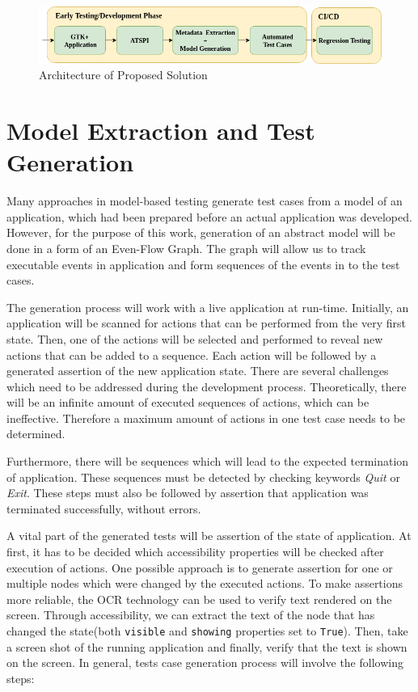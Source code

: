 \begin{figure}[hbt]
	\centering
	\includegraphics[width=1\textwidth]{obrazky-figures/diagram.png}
	\caption{Architecture of Proposed Solution}
	\label{Diagram}
\end{figure}


\section{Model Extraction and Test Generation}
Many approaches in model-based testing generate test cases from a model of an application, which had been prepared before an actual application was developed. However, for the purpose of this work, generation of an abstract model will be done in a form of an Even-Flow Graph. The graph will allow us to track executable events in application and form sequences of the events in to the test cases. 

The generation process will work with a live application at run-time. Initially, an application will be scanned for actions that can be performed from the very first state. Then, one of the actions will be selected and performed to reveal new actions that can be added to a sequence. Each action will be followed by a generated assertion of the new application state. There are several challenges which need to be addressed during the development process. Theoretically, there will be an infinite amount of executed sequences of actions, which can be ineffective. Therefore a maximum amount of actions in one test case needs to be determined. 

Furthermore, there will be sequences which will lead to the expected termination of application. These sequences must be detected by checking keywords \textit{Quit} or \textit{Exit}. These steps must also be followed by assertion that application was terminated successfully, without errors. 

A vital part of the generated tests will be assertion of the state of application. At first, it has to be decided which accessibility properties will be checked after execution of actions. One possible approach is to generate assertion for one or multiple nodes which were changed by the executed actions. To make assertions more reliable, the OCR technology can be used to verify text rendered on the screen. Through accessibility, we can extract the text of the node that has changed the state(both \verb|visible| and \verb|showing| properties set to \verb|True|). Then, take a screen shot of the running application and finally, verify that the text is shown on the screen. 
In general, tests case generation process will involve the following steps: 

